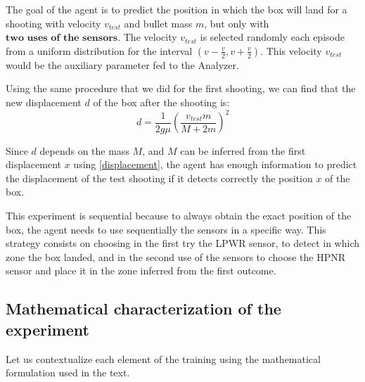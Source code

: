 \documentclass[11pt,a4paper,twoside]{report}
\newcommand{\+}{\textnormal{+} }
\theoremstyle{definition}
\numberwithin{equation}{chapter}
\begin{document}
The goal of the agent is to predict the position in which the box will
land for a shooting with velocity $v_{test}$ and bullet mass $m$, but only with
$\textbf{two uses of the sensors}$. The velocity $v_{test}$ is selected randomly
each episode from a uniform distribution for the interval $(v-\frac{v}{2},
v+\frac{v}{2})$. This velocity $v_{test}$ would be the auxiliary parameter fed
to the Analyzer. 

Using the same procedure that we did for the first shooting, we can find that
the new displacement $d$ of the box after the shooting is:
\begin{equation}
  d=\frac{1}{2g\mu}\left(\frac{v_{test}m}{M+2m} \right)^2
\end{equation}

Since $d$ depends on the mass $M$, and $M$ can be inferred from the first
displacement $x$ using \eqref{displacement}, the agent has enough information
to predict the displacement of the test shooting if it detects correctly the 
position $x$ of the box.

This experiment is sequential because to always obtain the exact position of the
box, the agent needs to use sequentially the sensors in a specific way. This
strategy consists on choosing in the first try the LPWR sensor, to detect in
which zone the box landed, and in the second use of the sensors to choose the
HPNR sensor and place it in the zone inferred from the first outcome.

\subsection{Mathematical characterization of the experiment}

Let us contextualize each element of the training using the mathematical
formulation used in the text.
\end{document}
